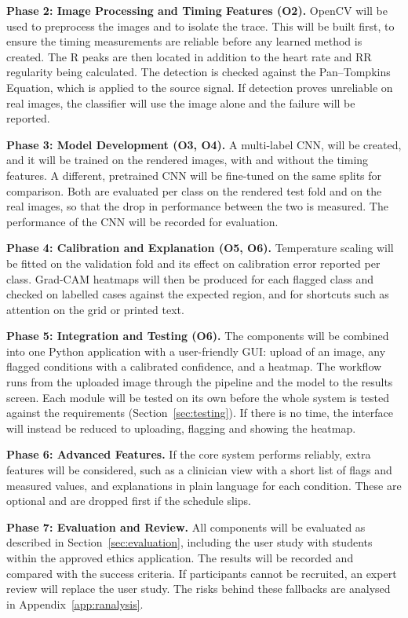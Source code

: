 \textbf{Phase 2: Image Processing and Timing Features (O2).} OpenCV will be used to preprocess the images and to isolate the trace. This will be built first, to ensure the timing measurements are reliable before any learned method is created. The R peaks are then
located in addition to the heart rate and RR regularity being calculated. The detection is checked against the Pan--Tompkins Equation, which is applied to the source signal. If detection proves unreliable on real
images, the classifier will use the image alone and the failure will be reported.

\textbf{Phase 3: Model Development (O3, O4).} A multi-label CNN, will be created, and it will be trained on the rendered images, with and without the timing features. A different, pretrained
CNN will be fine-tuned on the same splits for comparison. Both are evaluated per class on the rendered test fold and on the real images, so that the drop in performance between the two is measured. The performance of the CNN will be recorded for evaluation.

\textbf{Phase 4: Calibration and Explanation (O5, O6).} Temperature scaling will be fitted on the validation fold and its effect on calibration error reported per class. Grad-CAM
heatmaps will then be produced for each flagged class and checked on labelled cases against the expected region, and for shortcuts such as attention on the grid or printed text.

\textbf{Phase 5: Integration and Testing (O6).} The components will be combined into one Python application with a user-friendly GUI: upload of an image, any flagged
conditions with a calibrated confidence, and a heatmap. The workflow runs from the uploaded image through the pipeline and the model to
the results screen. Each module will be tested on its own before the whole system is tested against the requirements (Section~\ref{sec:testing}). If there is no time, the interface will instead be reduced to uploading, flagging and showing the heatmap.

\textbf{Phase 6: Advanced Features.} If the core system performs reliably, extra features will be considered, such as a clinician view with a short list of flags and measured values, and explanations in plain language for each condition. These are optional and are dropped
first if the schedule slips.

\textbf{Phase 7: Evaluation and Review.} All components will be evaluated as described in Section~\ref{sec:evaluation}, including the user study with students within the approved
ethics application. The results will be recorded and compared with the success criteria. If participants cannot be recruited, an expert review will
replace the user study. The risks behind these fallbacks are analysed in
Appendix~\ref{app:ranalysis}.

